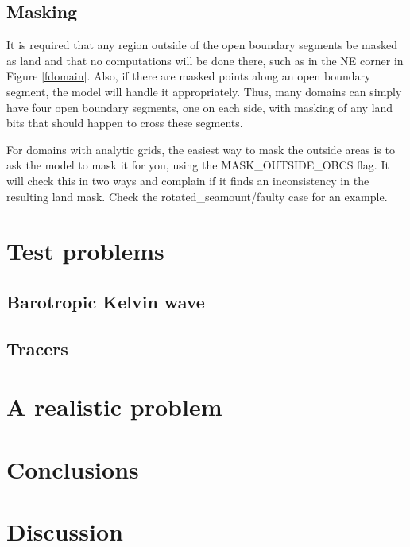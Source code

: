 \documentclass[11pt]{article}
\begin{document}
\subsection{Masking}
It is required that any region outside of the open boundary segments
be masked as land and that no computations will be done there, such
as in the NE corner in Figure \ref{fdomain}. Also, if there are
masked points along an open boundary segment, the model will handle
it appropriately. Thus, many domains can simply have four open
boundary segments, one on each side, with masking of any land bits
that should happen to cross these segments.

For domains with analytic grids, the easiest way to mask the outside
areas is to ask the model to mask it for you, using the MASK\_OUTSIDE\_OBCS
flag. It will check this in two ways and complain if it finds an
inconsistency in the resulting land mask. Check the rotated\_seamount/faulty
case for an example.

\section{Test problems}
\subsection{Barotropic Kelvin wave}
\subsection{Tracers}
\section{A realistic problem}
\section{Conclusions}
\section{Discussion}



\end{document}
